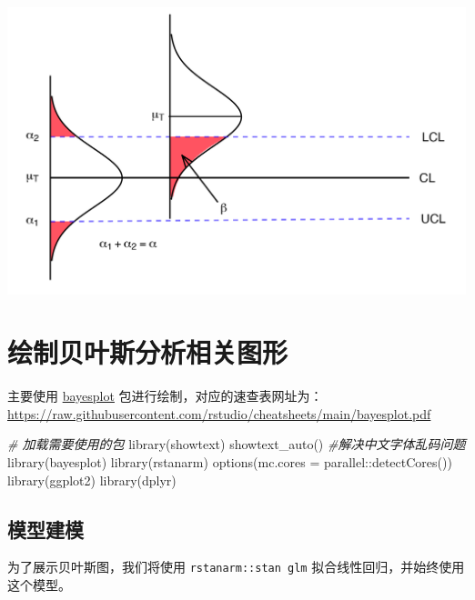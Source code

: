 \documentclass[
]{book}
\newenvironment{Shaded}{\begin{snugshade}}{\end{snugshade}}
\newcommand{\AttributeTok}[1]{\textcolor[rgb]{0.77,0.63,0.00}{#1}}
\newcommand{\CommentTok}[1]{\textcolor[rgb]{0.56,0.35,0.01}{\textit{#1}}}
\newcommand{\FunctionTok}[1]{\textcolor[rgb]{0.00,0.00,0.00}{#1}}
\newcommand{\NormalTok}[1]{#1}
\newcommand{\SpecialCharTok}[1]{\textcolor[rgb]{0.00,0.00,0.00}{#1}}
\begin{document}
\includegraphics{images/paste-39BF420C.png}

\hypertarget{ux7ed8ux5236ux8d1dux53f6ux65afux5206ux6790ux76f8ux5173ux56feux5f62}{%
\section{绘制贝叶斯分析相关图形}\label{ux7ed8ux5236ux8d1dux53f6ux65afux5206ux6790ux76f8ux5173ux56feux5f62}}

主要使用 \href{https://github.com/stan-dev/bayesplot}{bayesplot} 包进行绘制，对应的速查表网址为：\url{https://raw.githubusercontent.com/rstudio/cheatsheets/main/bayesplot.pdf}

\begin{Shaded}
\begin{Highlighting}[]
\CommentTok{\# 加载需要使用的包}
\FunctionTok{library}\NormalTok{(showtext)}
\FunctionTok{showtext\_auto}\NormalTok{() }\CommentTok{\#解决中文字体乱码问题}
\FunctionTok{library}\NormalTok{(bayesplot) }
\FunctionTok{library}\NormalTok{(rstanarm) }
\FunctionTok{options}\NormalTok{(}\AttributeTok{mc.cores =}\NormalTok{ parallel}\SpecialCharTok{::}\FunctionTok{detectCores}\NormalTok{()) }
\FunctionTok{library}\NormalTok{(ggplot2) }
\FunctionTok{library}\NormalTok{(dplyr)}
\end{Highlighting}
\end{Shaded}

\hypertarget{ux6a21ux578bux5efaux6a21}{%
\subsection{模型建模}\label{ux6a21ux578bux5efaux6a21}}

为了展示贝叶斯图，我们将使用 \texttt{rstanarm::stan\ glm} 拟合线性回归，并始终使用这个模型。
\end{document}
